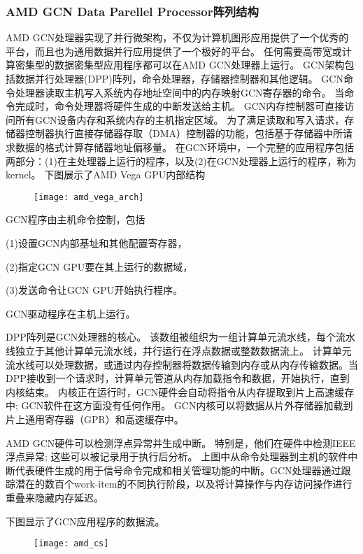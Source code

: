 \subsubsection{AMD GCN Data Parellel Processor阵列结构}
 AMD GCN处理器实现了并行微架构，不仅为计算机图形应用提供了一个优秀的平台，而且也为通用数据并行应用提供了一个极好的平台。 任何需要高带宽或计算密集型的数据密集型应用程序都可以在AMD GCN处理器上运行。
GCN架构包括数据并行处理器(DPP)阵列，命令处理器，存储器控制器和其他逻辑。 GCN命令处理器读取主机写入系统内存地址空间中的内存映射GCN寄存器的命令。 当命令完成时，命令处理器将硬件生成的中断发送给主机。 GCN内存控制器可直接访问所有GCN设备内存和系统内存的主机指定区域。 为了满足读取和写入请求，存储器控制器执行直接存储器存取（DMA）控制器的功能，包括基于存储器中所请求数据的格式计算存储器地址偏移量。 在GCN环境中，一个完整的应用程序包括两部分：(1)在主处理器上运行的程序，以及(2)在GCN处理器上运行的程序，称为kernel。
下图展示了AMD Vega GPU内部结构
\begin{figure}[htbp]
	\centering
	\texttt{[image: amd\_vega\_arch]}
	\label{fig:amd_vega_arch}
\end{figure}

GCN程序由主机命令控制，包括

(1)设置GCN内部基址和其他配置寄存器，

(2)指定GCN GPU要在其上运行的数据域，

(3)发送命令让GCN GPU开始执行程序。

GCN驱动程序在主机上运行。

DPP阵列是GCN处理器的核心。 该数组被组织为一组计算单元流水线，每个流水线独立于其他计算单元流水线，并行运行在浮点数据或整数数据流上。 计算单元流水线可以处理数据，或通过内存控制器将数据传输到内存或从内存传输数据。当DPP接收到一个请求时，计算单元管道从内存加载指令和数据，开始执行，直到内核结束。 内核正在运行时，GCN硬件会自动将指令从内存提取到片上高速缓存中; GCN软件在这方面没有任何作用。 GCN内核可以将数据从片外存储器加载到片上通用寄存器（GPR）和高速缓存中。

AMD GCN硬件可以检测浮点异常并生成中断。 特别是，他们在硬件中检测IEEE浮点异常; 这些可以被记录用于执行后分析。 上图中从命令处理器到主机的软件中断代表硬件生成的用于信号命令完成和相关管理功能的中断。GCN处理器通过跟踪潜在的数百个work-item的不同执行阶段，以及将计算操作与内存访问操作进行重叠来隐藏内存延迟。

下图显示了GCN应用程序的数据流。
\begin{figure}[htbp]
	\centering
	\texttt{[image: amd\_cs]}
	\label{fig:amd_cs}
\end{figure}

